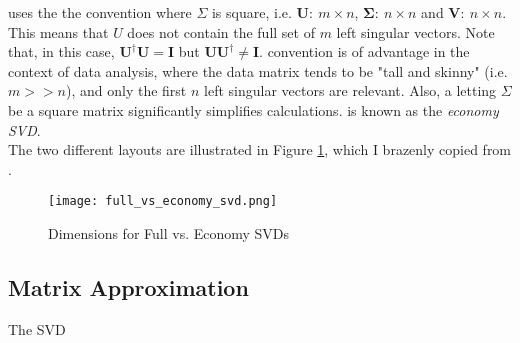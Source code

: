  uses the the convention where $\Sigma$ is square, i.e. $\mathbf{U}:\ m\times n$, $\mathbf{\Sigma}:\ n\times n$ and $\mathbf{V}:\ n\times n$. This means that $U$ does not contain the full set of $m$ left singular vectors. Note that, in this case, $\mathbf{U^{\dagger}}\mathbf{U} = \mathbf{I}$ but $\mathbf{U}\mathbf{U^{\dagger}} \neq \mathbf{I}$.  convention is of advantage in the context of data analysis, where the data matrix tends to be "tall and skinny" (i.e. $m>>n$), and only the first $n$ left singular vectors are relevant. Also, a letting $\Sigma$ be a square matrix significantly simplifies calculations.  is known as the \textit{economy SVD}.\\

The two different layouts are illustrated in Figure \ref{fig:full_vs_economy_svd}, which I brazenly copied from .

\begin{figure}
\centering
\texttt{[image: full\_vs\_economy\_svd.png]}
\caption{Dimensions for Full vs. Economy SVDs}
\label{fig:full_vs_economy_svd}
\end{figure}

\subsection{Matrix Approximation}
The SVD 